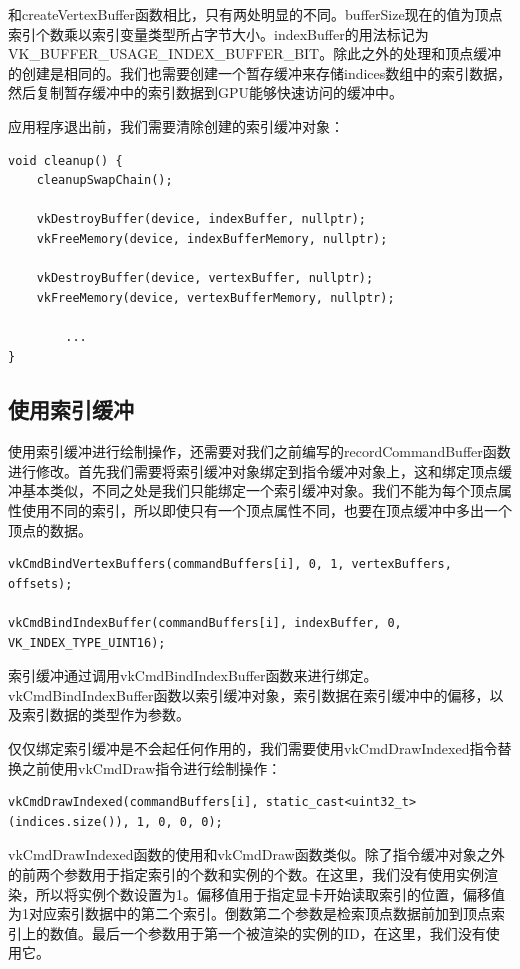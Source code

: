 \documentclass{ctexart}
\begin{document}
和createVertexBuffer函数相比，只有两处明显的不同。bufferSize现在的值为顶点索引个数乘以索引变量类型所占字节大小。indexBuffer的用法标记为VK\_BUFFER\_USAGE\_INDEX\_BUFFER\_BIT。除此之外的处理和顶点缓冲的创建是相同的。我们也需要创建一个暂存缓冲来存储indices数组中的索引数据，然后复制暂存缓冲中的索引数据到GPU能够快速访问的缓冲中。

应用程序退出前，我们需要清除创建的索引缓冲对象：

\begin{lstlisting}[language={[ANSI]C}]
void cleanup() {
	cleanupSwapChain();

	vkDestroyBuffer(device, indexBuffer, nullptr);
	vkFreeMemory(device, indexBufferMemory, nullptr);

	vkDestroyBuffer(device, vertexBuffer, nullptr);
	vkFreeMemory(device, vertexBufferMemory, nullptr);

		...
}
\end{lstlisting}

\subsection{使用索引缓冲}

使用索引缓冲进行绘制操作，还需要对我们之前编写的recordCommandBuffer函数进行修改。首先我们需要将索引缓冲对象绑定到指令缓冲对象上，这和绑定顶点缓冲基本类似，不同之处是我们只能绑定一个索引缓冲对象。我们不能为每个顶点属性使用不同的索引，所以即使只有一个顶点属性不同，也要在顶点缓冲中多出一个顶点的数据。

\begin{lstlisting}[language={[ANSI]C}]
vkCmdBindVertexBuffers(commandBuffers[i], 0, 1, vertexBuffers, offsets);

vkCmdBindIndexBuffer(commandBuffers[i], indexBuffer, 0, VK_INDEX_TYPE_UINT16);
\end{lstlisting}

索引缓冲通过调用vkCmdBindIndexBuffer函数来进行绑定。vkCmdBindIndexBuffer函数以索引缓冲对象，索引数据在索引缓冲中的偏移，以及索引数据的类型作为参数。

仅仅绑定索引缓冲是不会起任何作用的，我们需要使用vkCmdDrawIndexed指令替换之前使用vkCmdDraw指令进行绘制操作：

\begin{lstlisting}[language={[ANSI]C}]
vkCmdDrawIndexed(commandBuffers[i], static_cast<uint32_t>(indices.size()), 1, 0, 0, 0);
\end{lstlisting}

vkCmdDrawIndexed函数的使用和vkCmdDraw函数类似。除了指令缓冲对象之外的前两个参数用于指定索引的个数和实例的个数。在这里，我们没有使用实例渲染，所以将实例个数设置为1。偏移值用于指定显卡开始读取索引的位置，偏移值为1对应索引数据中的第二个索引。倒数第二个参数是检索顶点数据前加到顶点索引上的数值。最后一个参数用于第一个被渲染的实例的ID，在这里，我们没有使用它。
\end{document}
